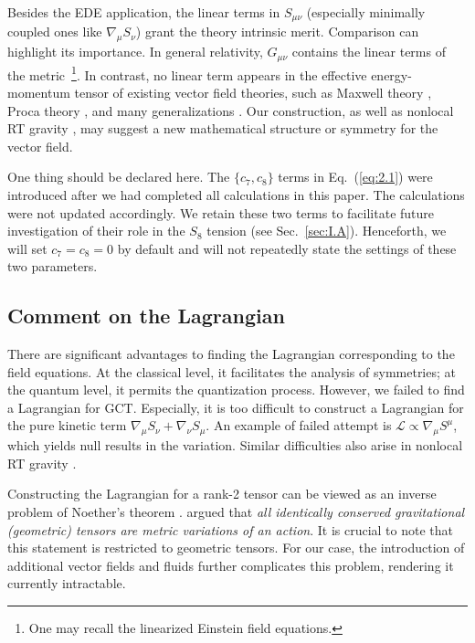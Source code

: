 \documentclass[aps,prd,twocolumn]{revtex4-2}
\begin{document}
Besides the EDE application, the linear terms in $S_{\mu\nu}$ (especially minimally coupled ones like $\nabla_\mu S_\nu$) grant the theory intrinsic merit. Comparison can highlight its importance. In general relativity, $G_{\mu\nu}$ contains the linear terms of the metric~\footnote{One may recall the linearized Einstein field equations.}. In contrast, no linear term appears in the effective energy-momentum tensor of existing vector field theories, such as Maxwell theory \cite{Maxwell1861.PhilosMag.90.11,Maxwell1865.PhilosTransRSocLondon.155.459}, Proca theory \cite{Proca1936.NotEngJ.7.347}, and many generalizations \cite{Tasinato2014.JHighEnergyPhys.04.067,Heisenberg2014.JCAP.05.015}. Our construction, as well as nonlocal RT gravity \cite{Maggiore2014.PRD.89.043008}, may suggest a new mathematical structure or symmetry for the vector field.

One thing should be declared here. The $\{c_7,c_8\}$ terms in Eq.~(\ref{eq:2.1}) were introduced after we had completed all calculations in this paper. The calculations were not updated accordingly. We retain these two terms to facilitate future investigation of their role in the $S_8$ tension (see Sec.~\ref{sec:I.A}). Henceforth, we will set $c_7=c_8=0$ by default and will not repeatedly state the settings of these two parameters.

\subsection{Comment on the Lagrangian}
There are significant advantages to finding the Lagrangian corresponding to the field equations. At the classical level, it facilitates the analysis of symmetries; at the quantum level, it permits the quantization process. However, we failed to find a Lagrangian for GCT. Especially, it is too difficult to construct a Lagrangian for the pure kinetic term $\nabla_\mu S_\nu + \nabla_\nu S_\mu$. An example of failed attempt is $\mathcal{L}\propto \nabla_\mu S^\mu$, which yields null results in the variation. Similar difficulties also arise in nonlocal RT gravity \cite{Maggiore2014.PRD.89.043008}.

Constructing the Lagrangian for a rank-2 tensor can be viewed as an inverse problem of Noether's theorem \cite{Deser2018.PLB.790.533}. \citet{Deser2023.AnnPhysNY.448.169163} argued that \textit{all identically conserved gravitational (geometric) tensors are metric variations of an action}. It is crucial to note that this statement is restricted to geometric tensors. For our case, the introduction of additional vector fields and fluids further complicates this problem, rendering it currently intractable.
\end{document}
